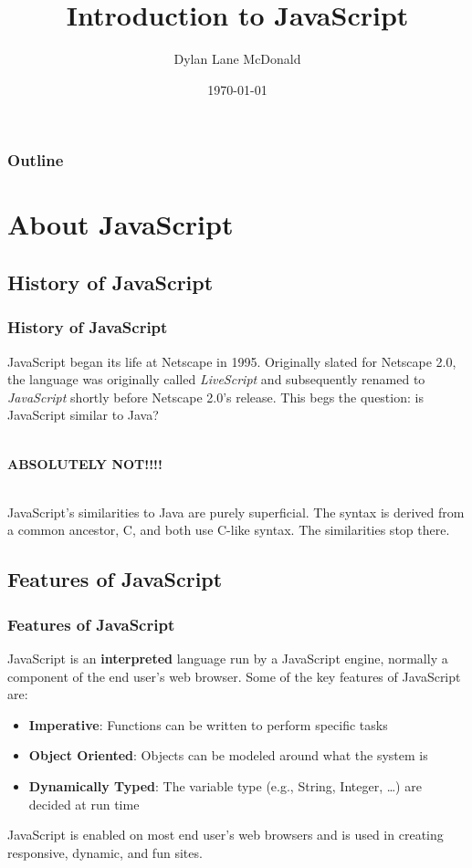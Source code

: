 \documentclass[aspectratio=169]{beamer}
\title{Introduction to JavaScript}
\author{Dylan Lane McDonald}
\institute{CNM STEMulus Center\\Web Development with PHP}
\date{\today}
\begin{document}
\lstset{language=HTML}
\begin{frame}
\titlepage
\end{frame}

\begin{frame}
\frametitle{Outline}
\tableofcontents
\end{frame}

\section{About JavaScript}
\subsection{History of JavaScript}
\begin{frame}
\frametitle{History of JavaScript}
JavaScript began its life at Netscape in 1995. Originally slated for Netscape 2.0, the language was originally called \textit{LiveScript} and subsequently renamed to \textit{JavaScript} shortly before Netscape 2.0's release. This begs the question: is JavaScript similar to Java?

\mbox{}\\
\pause
\textbf{ABSOLUTELY NOT!!!!}

\mbox{}\\
\pause
JavaScript's similarities to Java are purely superficial. The syntax is derived from a common ancestor, C, and both use C-like syntax. The similarities stop there.
\end{frame}

\subsection{Features of JavaScript}
\begin{frame}
\frametitle{Features of JavaScript}
JavaScript is an \textbf{interpreted} language run by a JavaScript engine, normally a component of the end user's web browser. Some of the key features of JavaScript are:
\begin{itemize}
	\item \textbf{Imperative}: Functions can be written to perform specific tasks
	\item \textbf{Object Oriented}: Objects can be modeled around what the system is
	\item \textbf{Dynamically Typed}: The variable type (e.g., String, Integer, \dots) are decided at run time 
\end{itemize}
JavaScript is enabled on most end user's web browsers and is used in creating responsive, dynamic, and fun sites.
\end{frame}
\end{document}

